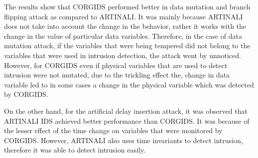 The results show that CORGIDS performed better in data mutation and branch flipping attack as compared to ARTINALI. It was mainly because ARTINALI does not take into account the change in the behavior, rather it works with the change in the value of particular data variables. Therefore, in the case of data mutation attack, if the variables that were being tempered did not belong to the variables that were used in intrusion detection, the attack went by unnoticed. However, for CORGIDS even if physical variables that are used to detect intrusion were not mutated, due to the trickling effect the, change in data variable led to in some cases a change in the physical variable which was detected by CORGIDS.

On the other hand, for the artificial delay insertion attack, it was observed that ARTINALI IDS achieved better performance than CORGIDS. It was because of the lesser effect of the time change on variables that were monitored by CORGIDS. However, ARTINALI also uses time invariants to detect intrusion, therefore it was able to detect intrusion easily.



\endinput
